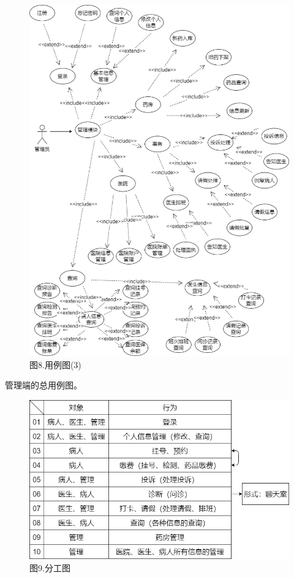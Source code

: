\documentclass[24pt,a4paper]{article}%
\begin{document}
\begin{figure}[H]
    \centering
    \includegraphics[width=1\textwidth]{image/用例图(3).png}
    \caption*{图8.用例图(3)}
\end{figure}
管理端的总用例图。
\begin{figure}[H]
    \centering
    \includegraphics[width=1\textwidth]{image/分工图.png}
    \caption*{图9.分工图}
\end{figure}
\end{document}
